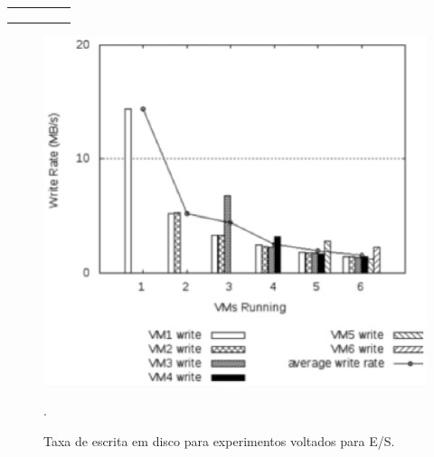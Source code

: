 \begin{table}[]
{\begin{tabular}{lllll}
                                             &                                      &                                 &                                                                                                                                                  &  \\
                                             &                                      &                                 &                                                                                                                                                  &  \\
                                             &                                      &                                 &                                                                                                                                                  & 
\end{tabular}}
\end{table}

\begin{figure}[!htb]
\centering
\includegraphics [keepaspectratio=true,scale=0.65]{figuras/iobound_experiments.eps}
\caption{Taxa de escrita em disco para experimentos voltados para E/S.}
\cite{popiolek2012}.
\label{iobound_experiments}
\end{figure}

